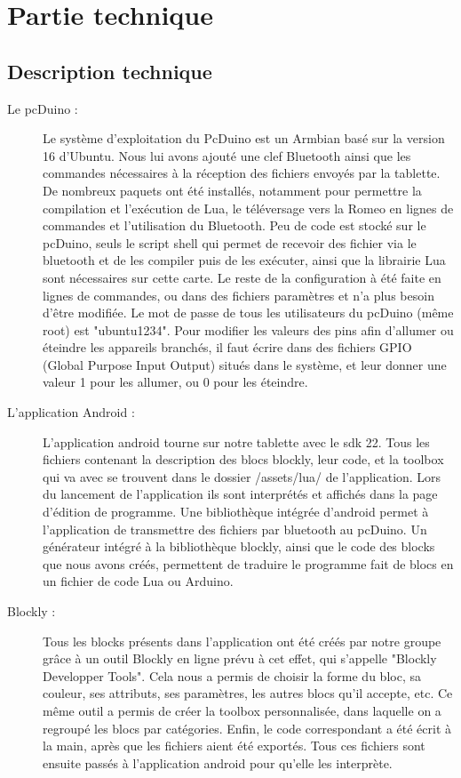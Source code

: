 \documentclass[12pt,francais]{report}
\begin{document}
\chapter*{Partie technique}
\section*{Description technique}

\begin{description}
\item [Le pcDuino :] Le système d'exploitation du PcDuino est un Armbian basé sur la version 16 d'Ubuntu. Nous lui avons ajouté une clef Bluetooth ainsi que les commandes nécessaires à la réception des fichiers envoyés par la tablette. De nombreux paquets ont été installés, notamment pour permettre la compilation et l'exécution de Lua, le téléversage vers la Romeo en lignes de commandes et l'utilisation du Bluetooth. 
Peu de code est stocké sur le pcDuino, seuls le script shell qui permet de recevoir des fichier via le bluetooth et de les compiler puis de les exécuter, ainsi que la librairie Lua sont nécessaires sur cette carte. Le reste de la configuration à été faite en lignes de commandes, ou dans des fichiers paramètres et n'a plus besoin d'être modifiée.
Le mot de passe de tous les utilisateurs du pcDuino (même root) est "ubuntu1234".
Pour modifier les valeurs des pins afin d'allumer ou éteindre les appareils branchés, il faut écrire dans des fichiers GPIO (Global Purpose Input Output)\cite{ref26} situés dans le système, et leur donner une valeur 1 pour les allumer, ou 0 pour les éteindre.

\item [L'application Android :] L'application android tourne sur notre tablette avec le sdk 22. 
Tous les fichiers contenant la description des blocs blockly, leur code, et la toolbox qui va avec se trouvent dans le dossier /assets/lua/ de l'application. Lors du lancement de l'application ils sont interprétés et affichés dans la page d'édition de programme. Une bibliothèque intégrée d'android permet à l'application de transmettre des fichiers par bluetooth au pcDuino.
Un générateur intégré à la bibliothèque blockly, ainsi que le code des blocks que nous avons créés, permettent de traduire le programme fait de blocs en un fichier de code Lua ou Arduino.

\item [Blockly :] Tous les blocks présents dans l'application ont été créés par notre groupe grâce à un outil Blockly en ligne prévu à cet effet, qui s'appelle "Blockly Developper Tools"\cite{ref25}. Cela nous a permis de choisir la forme du bloc, sa couleur, ses attributs, ses paramètres, les autres blocs qu'il accepte, etc. Ce même outil a permis de créer la toolbox personnalisée, dans laquelle on a regroupé les blocs par catégories. Enfin, le code correspondant a été écrit à la main, après que les fichiers aient été exportés. Tous ces fichiers sont ensuite passés à l'application android pour qu'elle les interprète.


\end{description}
\end{document}
